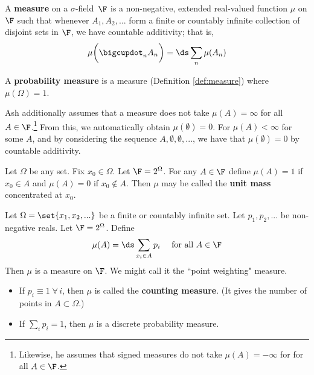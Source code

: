 \documentclass{article} %
\renewcommand{\sf}{$\sigma$-field}
\begin{document}
\begin{definition}
A \textbf{measure} on a \sf\ $\F$ is a non-negative, extended real-valued function $\mu$ on $\F$ such that whenever $A_1, A_2, ...$ form a finite or countably infinite collection of disjoint sets in $\F$, we have countable additivity; that is,
\[ \mu \bigg( \bigcupdot_n A_n \bigg) = \ds\sum_n \mu(A_n) \]
\label{def:measure}	
\end{definition}

\begin{definition}
A \textbf{probability measure} is a measure (Definition \ref{def:measure}) where $\mu(\Omega)=1$.
\label{def:prob_measure}		
\end{definition}

\begin{remark}
Ash additionally assumes that a measure does not take $\mu(A) = \infty$ for all $A \in \F$.\footnote{Likewise, he assumes that signed measures do not take $\mu(A) = -\infty$ for  for all $A \in \F$.}  From this, we automatically obtain $\mu(\emptyset)=0$. For $\mu(A) < \infty$ for some $A$, and by considering the sequence $A, \emptyset, \emptyset, ...$, we have that $\mu(\emptyset)=0$ by countable additivity.   	
\end{remark}

\begin{example}
Let $\Omega$ be any set.  Fix $x_0 \in \Omega$.  Let $\F = 2^\Omega$.  For any $A \in \F$ define $\mu(A) = 1$ if $x_0 \in A$ and $\mu(A) = 0$ if $x_0 \not\in A$.  Then $\mu$ may be called the \textbf{unit mass} concentrated at $x_0$.
\end{example}

\begin{example}
Let $\Omega = \set{x_1,x_2,...}$ be a finite or countably infinite set.  Let $p_1, p_2,...$ be non-negative reals.  Let $\F = 2^\Omega$.  Define
\[\mu(A) = \ds\sum_{x_i \in A} p_i \quad \text{ for all } A \in \F\]
Then $\mu$ is a measure on $\F$. We might call it the ``point weighting" measure. 
\begin{itemize}
\item If $p_i \equiv 1 \; \forall \, i$, then $\mu$ is called the \textbf{counting measure}. (It gives the number of points in $A \subset \Omega$.)
\item If $\sum_i p_i =1$, then $\mu$ is a discrete probability measure.	
\end{itemize}
	
\end{example}
\end{document}
